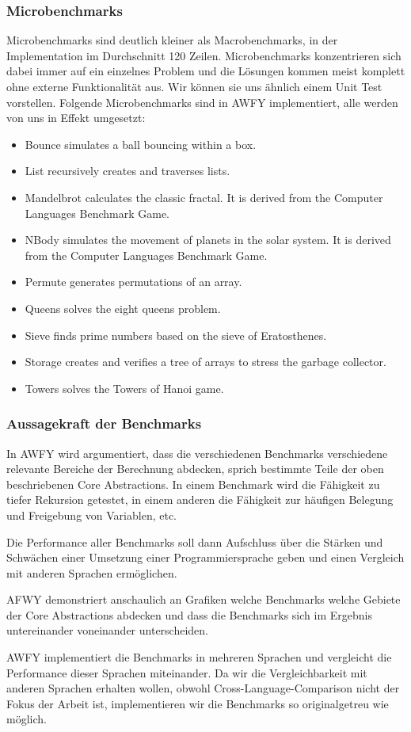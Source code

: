 \subsubsection{Microbenchmarks}
Microbenchmarks sind deutlich kleiner als Macrobenchmarks, in der Implementation im Durchschnitt 120 Zeilen. %
Microbenchmarks konzentrieren sich dabei immer auf ein einzelnes Problem und die Lösungen kommen meist komplett ohne externe Funktionalität aus. Wir können sie uns ähnlich einem Unit Test vorstellen.
Folgende Microbenchmarks sind in AWFY implementiert, alle werden von uns in Effekt umgesetzt:
\begin{itemize}
    \item Bounce simulates a ball bouncing within a box.
    \item List recursively creates and traverses lists.
    \item Mandelbrot calculates the classic fractal. It is derived from the Computer Languages Benchmark Game.
    \item NBody simulates the movement of planets in the solar system. It is derived from the Computer Languages Benchmark Game.
    \item Permute generates permutations of an array.
    \item Queens solves the eight queens problem.
    \item Sieve finds prime numbers based on the sieve of Eratosthenes.
    \item Storage creates and verifies a tree of arrays to stress the garbage collector.
    \item Towers solves the Towers of Hanoi game.
\end{itemize}

\subsubsection{Aussagekraft der Benchmarks}
In AWFY wird argumentiert, dass die verschiedenen Benchmarks verschiedene relevante Bereiche der Berechnung abdecken, sprich bestimmte Teile der oben beschriebenen Core Abstractions.
In einem Benchmark wird die Fähigkeit zu tiefer Rekursion getestet, in einem anderen die Fähigkeit zur häufigen Belegung und Freigebung von Variablen, etc.

Die Performance aller Benchmarks soll dann Aufschluss über die Stärken und Schwächen einer Umsetzung einer Programmiersprache geben und einen Vergleich mit anderen Sprachen ermöglichen.

AFWY demonstriert anschaulich an Grafiken welche Benchmarks welche Gebiete der Core Abstractions abdecken und dass die Benchmarks sich im Ergebnis untereinander voneinander unterscheiden.

AWFY implementiert die Benchmarks in mehreren Sprachen und vergleicht die Performance dieser Sprachen miteinander. Da wir die Vergleichbarkeit mit anderen Sprachen erhalten wollen, obwohl Cross-Language-Comparison nicht der Fokus der Arbeit ist, implementieren wir die Benchmarks so originalgetreu wie möglich. 
